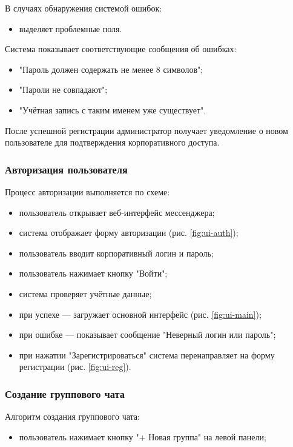 В случаях обнаружения системой ошибок:

\begin{itemize}
	\item выделяет проблемные поля.
\end{itemize}

Система показывает соответствующие сообщения об ошибках:  

\begin{itemize}
	\item "Пароль должен содержать не менее 8 символов";  
	\item "Пароли не совпадают";  
	\item "Учётная запись с таким именем уже существует".   
\end{itemize}

После успешной регистрации администратор получает уведомление о новом пользователе для подтверждения корпоративного доступа. 

\subsubsection{Авторизация пользователя}  
Процесс авторизации выполняется по схеме:  
\begin{itemize}  
	\item пользователь открывает веб-интерфейс мессенджера;  
	\item система отображает форму авторизации (рис. \ref{fig:ui-auth});  
	\item пользователь вводит корпоративный логин и пароль;  
	\item пользователь нажимает кнопку "Войти";  
	\item система проверяет учётные данные;
		\item при успехе — загружает основной интерфейс (рис. \ref{fig:ui-main});  
		\item при ошибке — показывает сообщение "Неверный логин или пароль";   
	\item при нажатии "Зарегистрироваться" система перенаправляет на форму регистрации (рис. \ref{fig:ui-reg}).  
\end{itemize}  

\subsubsection{Создание группового чата}  
Алгоритм создания группового чата:  
\begin{itemize}  
	\item пользователь нажимает кнопку "+ Новая группа" на левой панели;
\end{itemize}

